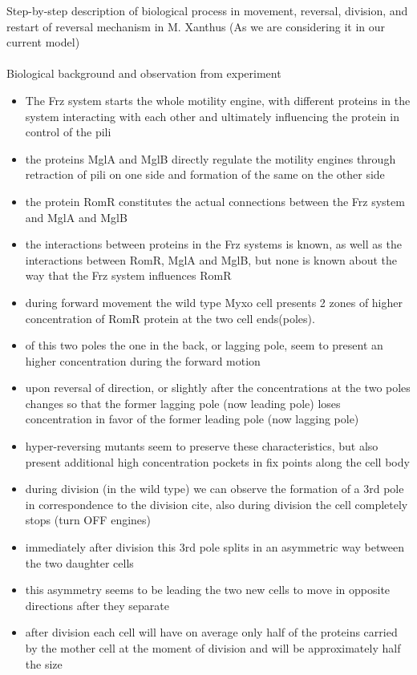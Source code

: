 \documentclass{amsart}
\theoremstyle{plain}
\numberwithin{equation}{section}
\begin{document}
Step-by-step description of biological process in movement, reversal, division, and restart of reversal mechanism in M. Xanthus (As we are considering it in our current model)\\\\
Biological background and observation from experiment\\
\begin{itemize}
\item The Frz system starts the whole motility engine, with different proteins in the system interacting with each other and ultimately influencing the protein in control of the pili
\item the proteins MglA and MglB directly regulate the motility engines through retraction of pili on one side and formation of the same on the other side
\item the protein RomR constitutes the actual connections between the Frz system and MglA and MglB
\item the interactions between proteins in the Frz systems is known, as well as the interactions between RomR, MglA and MglB, but none is known about the way that the Frz system influences RomR
\item during forward movement the wild type Myxo cell presents 2 zones of higher concentration of RomR protein at the two cell ends(poles).
\item of this two poles the one in the back, or lagging pole, seem to present an higher concentration during the forward motion
\item upon reversal of direction, or slightly after the concentrations at the two poles changes so that the former lagging pole (now leading pole) loses concentration in favor of the former leading pole (now lagging pole)
\item hyper-reversing mutants seem to preserve these characteristics, but also present additional high concentration pockets in fix points along the cell body
\item during division (in the wild type) we can observe the formation of a 3rd pole in correspondence to the division cite, also during division the cell completely stops (turn OFF engines)
\item immediately after division this 3rd pole splits in an asymmetric way between the two daughter cells
\item this asymmetry seems to be leading the two new cells to move in opposite directions after they separate
\item after division each cell will have on average only half of the proteins carried by the mother cell at the moment of division and will be approximately half the size
\end{itemize}
\end{document}
